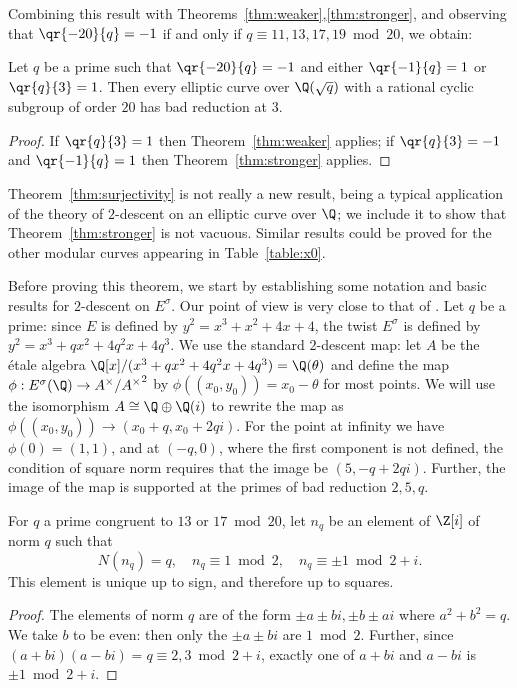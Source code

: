 \documentclass[12pt]{amsart}
\begin{document}
Combining this result with Theorems~\ref{thm:weaker},\ref{thm:stronger}, and observing that
$\qr{-20}{q} = -1$ if and only if $q \equiv 11, 13, 17, 19 \bmod 20$, we obtain:
\begin{cor}\label{cor:example}
Let $q$ be a prime such that $\qr{-20}{q} = -1$ and either $\qr{-1}{q} = 1$ or
$\qr{q}{3} = 1$.  Then every elliptic
curve over $\Q(\sqrt{q})$ with a rational cyclic subgroup of order $20$ has bad reduction at $3$.
\end{cor}

\begin{proof}
    If $\qr{q}{3} = 1$ then Theorem~\ref{thm:weaker} applies; if $\qr{q}{3} = -1$ and
    $\qr{-1}{q} = 1$ then Theorem~\ref{thm:stronger} applies.
\end{proof}

Theorem~\ref{thm:surjectivity}
is not really a new result, being a typical application of the theory of $2$-descent
on an elliptic curve over $\Q$; we include it to show that
Theorem~\ref{thm:stronger} is not vacuous.  Similar results could be proved for the other modular
curves appearing in Table~\ref{table:x0}.

Before proving this theorem, we start by establishing some notation and basic results for
$2$-descent on $E^\sigma$.  Our point of view is very close to that of \cite{schaefer}.
Let $q$ be a prime: since $E$ is defined by $y^2 = x^3+x^2+4x+4$,
the twist $E^\sigma$ is defined by $y^2 = x^3 + qx^2 + 4q^2x + 4q^3$.  
We use the standard $2$-descent map: let 
$A$ be the \'etale algebra $\Q[x]/(x^3+qx^2+4q^2x+4q^3) = \Q(\theta)$ and define
the map $\phi: E^\sigma(\Q) \to A^\times/{A^\times}^2$ by $\phi((x_0,y_0)) = x_0-\theta$ for 
most points.  We will use the isomorphism $A \cong \Q \oplus \Q(i)$ to rewrite the map
as $\phi((x_0,y_0)) \to (x_0+q,x_0+2qi)$.  For the point at infinity we have $\phi(0) = (1,1)$,
and at $(-q,0)$, where the first component is not defined, the condition of square norm
requires that the image be $(5,-q+2qi)$.  Further, the image of the map is supported at
the primes of bad reduction $2, 5, q$.

\begin{propdefn} For $q$ a prime congruent to $13$ or $17 \bmod 20$, let $n_q$ be an element
of $\Z[i]$ of norm $q$ such that
$$N(n_q) = q, \quad n_q \equiv 1 \bmod 2, \quad n_q \equiv \pm 1 \bmod 2+i.$$
This element is unique up to sign, and therefore up to squares.
\end{propdefn}

\begin{proof}
    The elements of norm $q$ are of the form $\pm a \pm bi, \pm b \pm ai$ where $a^2+b^2 = q$.
    We take $b$ to be even: then only the $\pm a \pm bi$ are $1 \bmod 2$.  Further, since
    $(a+bi)(a-bi) = q \equiv 2, 3 \bmod 2+i$, exactly one of $a+bi$ and $a-bi$ is $\pm 1 \bmod 2+i$.
\end{proof}
\end{document}
